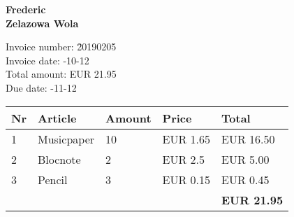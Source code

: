 \documentclass[a4paper]{article}
\begin{document}
\noindent\textbf{Frederic\\Zelazowa Wola}

\vspace{8mm}



\begin{tabbing}
Invoice number: \= 20190205 \\
Invoice date:   -10-12 \\
Total amount:   \> EUR 21.95 \\
Due date:       -11-12 \\
\end{tabbing}

\begin{tabular}{lp{30mm}ll|l}\\ \hline
{\bfseries Nr} &
{\bfseries Article} &
{\bfseries Amount} &
{\bfseries Price} &
{\bfseries Total} \\ \hline\hline
1 &Musicpaper &10 &EUR 1.65 &EUR 16.50 \\2 &Blocnote &2 &EUR 2.5 &EUR 5.00 \\3 &Pencil &3 &EUR 0.15 &EUR 0.45\\\hline
 & & & & \textbf{EUR 21.95} \\
\end{tabular}
\end{document}
